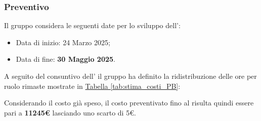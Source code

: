\subsubsection{Preventivo}
Il gruppo considera le seguenti date per lo sviluppo dell':
\begin{itemize}
    \item Data di inizio: 24 Marzo 2025;
    \item Data di fine: \textbf{30 Maggio 2025}.
\end{itemize}
A seguito del consuntivo dell' il gruppo ha definito la ridistribuzione delle ore per ruolo rimaste mostrate in \hyperref[tab:stima_costi_PB]{Tabella \ref{tab:stima_costi_PB}}:
\begin{table}[H]
    \centering
    \caption{Ripartizione ore e costi fino al PB.}
    \label{tab:stima_costi_PB} 
\end{table}
Considerando il costo già speso, il costo preventivato fino al  risulta quindi essere pari a \textbf{11245€} lasciando uno scarto di 5€.
